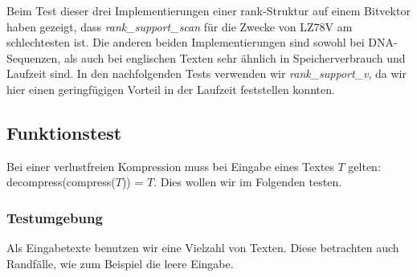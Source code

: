 \documentclass[a4paper,11pt]{scrartcl}%
\theoremstyle{change}
\theoremstyle{nonumberplain}
\theoremstyle{change}
\theoremstyle{nonumberplain}
\theoremstyle{change}
\theoremstyle{nonumberplain}
\begin{document}
Beim Test dieser drei Implementierungen einer rank-Struktur auf einem Bitvektor haben gezeigt, dass \textit{rank\_support\_scan} für die Zwecke von LZ78V am schlechtesten ist. Die anderen beiden Implementierungen sind sowohl bei DNA-Sequenzen, als auch bei englischen Texten sehr ähnlich in Speicherverbrauch und Laufzeit sind. In den nachfolgenden Tests verwenden wir \textit{rank\_support\_v}, da wir hier einen geringfügigen Vorteil in der Laufzeit feststellen konnten.
\newpage

\subsection{Funktionstest}

Bei einer verlustfreien Kompression muss bei Eingabe eines Textes $T$ gelten: \newline decompress(compress($T$)) = $T$. Dies wollen wir im Folgenden testen.

\subsubsection{Testumgebung}\label{functiontest}

Als Eingabetexte benutzen wir eine Vielzahl von Texten. Diese betrachten auch Randfälle, wie zum Beispiel die leere Eingabe.
\end{document}
